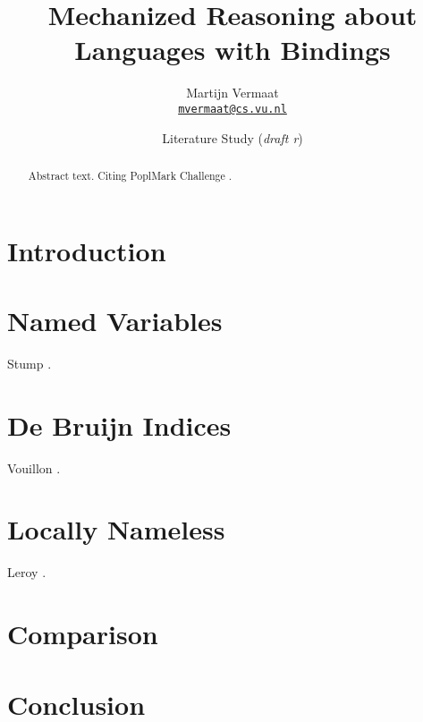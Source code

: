 \documentclass[a4paper,11pt]{article}
\title{\sffamily Mechanized Reasoning about Languages with Bindings}
\author{\sffamily
  Martijn Vermaat\\[0.3em]
  \href{mailto:mvermaat@cs.vu.nl}{\texttt{mvermaat@cs.vu.nl}}
}
\date{\sffamily Literature Study (\emph{draft r\svnrev})}
\begin{document}
\maketitle


\begin{abstract}
  Abstract text. Citing PoplMark Challenge \cite{Poplmark-Challenge-05}.
\end{abstract}


\section{Introduction}\label{sec:introduction}


\section{Named Variables}\label{sec:named}

Stump \cite{Stump-05}.


\section{De Bruijn Indices}\label{sec:debruijn}

Vouillon \cite{Vouillon-05}.


\section{Locally Nameless}\label{sec:locally-nameless}

Leroy \cite{Leroy-07}.


\section{Comparison}\label{sec:comparison}


\section{Conclusion}\label{sec:conclusion}




\end{document}

